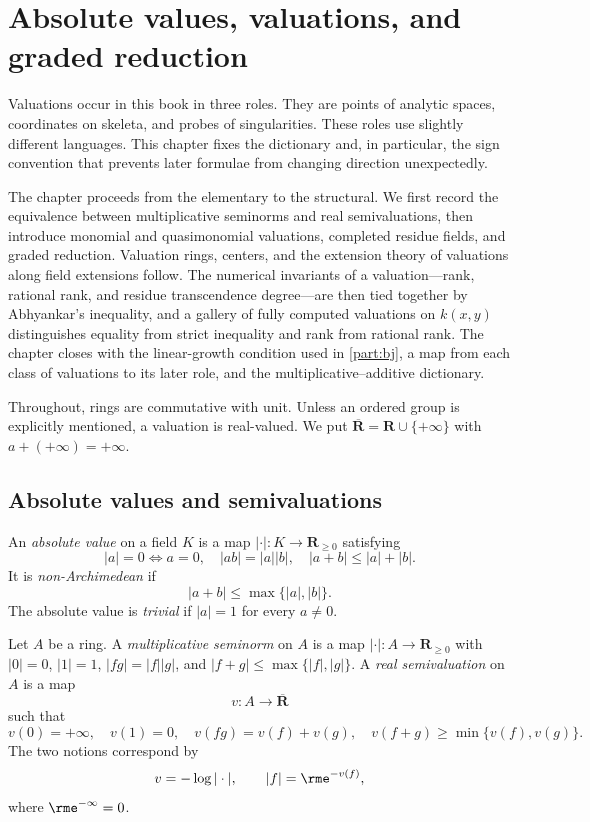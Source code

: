 \chapter{Absolute values, valuations, and graded reduction}
\label{chap:valuations}

Valuations occur in this book in three roles. They are points of analytic
spaces, coordinates on skeleta, and probes of singularities. These roles use
slightly different languages. This chapter fixes the dictionary and, in
particular, the sign convention that prevents later formulae from changing
direction unexpectedly.

The chapter proceeds from the elementary to the structural. We first record
the equivalence between multiplicative seminorms and real semivaluations,
then introduce monomial and quasimonomial valuations, completed residue
fields, and graded reduction. Valuation rings, centers, and the extension
theory of valuations along field extensions follow. The numerical invariants
of a valuation---rank, rational rank, and residue transcendence
degree---are then tied together by Abhyankar's inequality, and a gallery of
fully computed valuations on $k(x,y)$ distinguishes equality from strict
inequality and rank from rational rank. The chapter closes with the
linear-growth condition used in \cref{part:bj}, a map from each class of valuations to its later role,
and the multiplicative--additive dictionary.

Throughout, rings are commutative with unit. Unless an ordered group is
explicitly mentioned, a valuation is real-valued. We put
$\overline{\mathbf R}=\mathbf R\cup\{+\infty\}$ with
$a+(+\infty)=+\infty$.

\section{Absolute values and semivaluations}

\begin{definition}\label{def:absolute-value}
An \emph{absolute value} on a field $K$ is a map
$|\cdot|:K\to\mathbf R_{\geq0}$ satisfying
\[
 |a|=0\Longleftrightarrow a=0,\quad |ab|=|a||b|,\quad
 |a+b|\leq |a|+|b|.
\]
It is \emph{non-Archimedean} if
\[
                         |a+b|\leq\max\{|a|,|b|\}.
\]
The absolute value is \emph{trivial} if $|a|=1$ for every $a\ne0$.
\end{definition}

\begin{definition}\label{def:multiplicative-seminorm-semivaluation}
Let $A$ be a ring. A \emph{multiplicative seminorm} on $A$ is a map
$|\cdot|:A\to\mathbf R_{\geq0}$ with $|0|=0$, $|1|=1$,
$|fg|=|f||g|$, and $|f+g|\leq\max\{|f|,|g|\}$. A
\emph{real semivaluation} on $A$ is a map
\[
                    v:A\longrightarrow\overline{\mathbf R}
\]
such that
\[
 v(0)=+\infty,\quad v(1)=0,\quad
 v(fg)=v(f)+v(g),\quad
 v(f+g)\geq\min\{v(f),v(g)\}.
\]
The two notions correspond by
\[
                         v=-\log|\cdot|,
             \qquad |f|=\rme^{-v(f)},
\]
where $\rme^{-\infty}=0$.
\end{definition}


